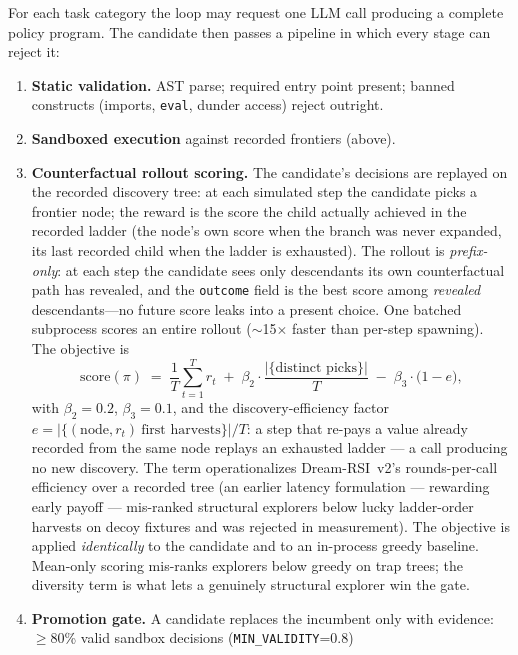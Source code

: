 \documentclass[11pt,a4paper]{article}
\newcommand{\hdr}[1]{\textbf{#1}}
\begin{document}
For each task category the loop may request one LLM call producing a complete
policy program. The candidate then passes a pipeline in which every stage can
reject it:

\begin{enumerate}
  \item \hdr{Static validation.} AST parse; required entry point present;
  banned constructs (imports, \texttt{eval}, dunder access) reject outright.
  \item \hdr{Sandboxed execution} against recorded frontiers (above).
  \item \hdr{Counterfactual rollout scoring.} The candidate's decisions are
  replayed on the recorded discovery tree: at each simulated step the
  candidate picks a frontier node; the reward is the score the child actually
  achieved in the recorded ladder (the node's own score when the branch was
  never expanded, its last recorded child when the ladder is exhausted).
  The rollout is \emph{prefix-only}: at each step the candidate sees only
  descendants its own counterfactual path has revealed, and the
  \texttt{outcome} field is the best score among \emph{revealed}
  descendants---no future score leaks into a present choice.
  One batched subprocess scores an entire rollout
  ($\sim$15$\times$ faster than per-step spawning). The objective is
  \begin{equation}
    \text{score}(\pi) \;=\; \frac{1}{T}\sum_{t=1}^{T} r_t
    \;+\; \beta_2 \cdot \frac{|\{\text{distinct picks}\}|}{T}
    \;-\; \beta_3 \cdot \bigl(1 - e\bigr),
  \end{equation}
  with $\beta_2 = 0.2$, $\beta_3 = 0.1$, and the discovery-efficiency
  factor $e = |\{(\text{node}, r_t)\ \text{first harvests}\}| / T$: a
  step that re-pays a value already recorded from the same node replays an
  exhausted ladder --- a call producing no new discovery. The term
  operationalizes Dream-RSI~v2's rounds-per-call efficiency over a recorded
  tree \cite{dreamrsi} (an earlier latency formulation --- rewarding early
  payoff --- mis-ranked structural explorers below lucky ladder-order
  harvests on decoy fixtures and was rejected in measurement). The
  objective is
  applied \emph{identically} to the candidate and to an in-process greedy
  baseline. Mean-only scoring mis-ranks explorers below greedy on trap trees;
  the diversity term is what lets a genuinely structural explorer win the
  gate.
  \item \hdr{Promotion gate.} A candidate replaces the incumbent only with
  evidence: $\geq$80\% valid sandbox decisions (\texttt{MIN\_VALIDITY}=0.8)

\end{enumerate}
\end{document}
